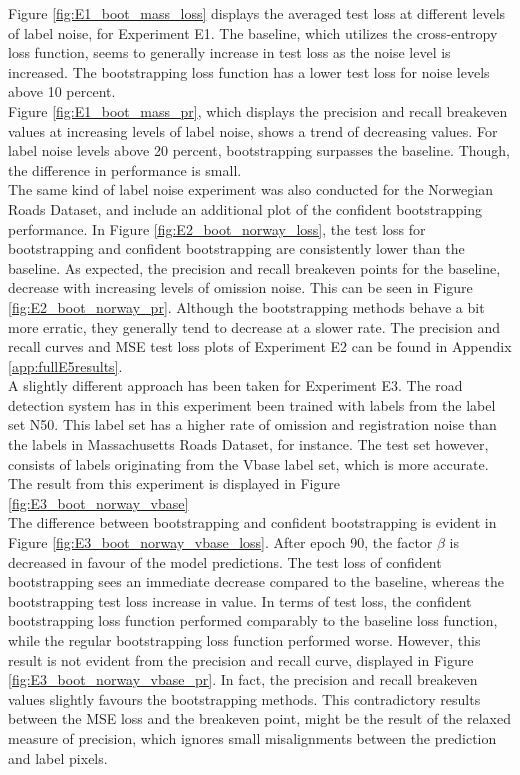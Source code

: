 Figure \ref{fig:E1_boot_mass_loss} displays the averaged test loss at different levels of label noise, for Experiment E1. The baseline, which utilizes the cross-entropy loss function, seems to generally increase in test loss as the noise level is increased. The bootstrapping loss function has a lower test loss for noise levels above 10 percent.\\

Figure \ref{fig:E1_boot_mass_pr}, which displays the precision and recall breakeven values at increasing levels of label noise, shows a trend of decreasing values.  For label noise levels above 20 percent, bootstrapping surpasses the baseline. Though, the difference in performance is small.\\

The same kind of label noise experiment was also conducted for the Norwegian Roads Dataset, and include an additional plot of the confident bootstrapping performance. In Figure \ref{fig:E2_boot_norway_loss}, the test loss for bootstrapping and confident bootstrapping are consistently lower than the baseline. As expected, the precision and recall breakeven points for the baseline, decrease with increasing levels of omission noise. This can be seen in Figure \ref{fig:E2_boot_norway_pr}. Although the bootstrapping methods behave a bit more erratic, they generally tend to decrease at a slower rate. The precision and recall curves and \ac{MSE} test loss plots of Experiment E2 can be found in Appendix \ref{app:fullE5results}.\\

A slightly different approach has been taken for Experiment E3. The road detection system has in this experiment been trained with labels from the label set N50. This label set has a higher rate of omission and registration noise than the labels in Massachusetts Roads Dataset, for instance. The test set however, consists of labels originating from the Vbase label set, which is more accurate. The result from this experiment is displayed in Figure \ref{fig:E3_boot_norway_vbase}\\

The difference between bootstrapping and confident bootstrapping is evident in Figure \ref{fig:E3_boot_norway_vbase_loss}. After epoch 90, the factor $\beta$ is decreased in favour of the model predictions. The test loss of confident bootstrapping sees an immediate decrease compared to the baseline, whereas the bootstrapping test loss increase in value. In terms of test loss, the confident bootstrapping loss function performed comparably to the baseline loss function, while the regular bootstrapping loss function performed worse. However, this result is not evident from the precision and recall curve, displayed in Figure \ref{fig:E3_boot_norway_vbase_pr}. In fact, the precision and recall breakeven values slightly favours the bootstrapping methods. This contradictory results between the MSE loss and the breakeven point, might be the result of the relaxed measure of precision, which ignores small misalignments between the prediction and label pixels.\\

